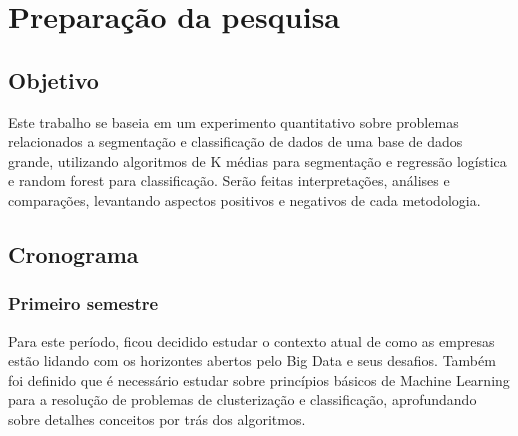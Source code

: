 
\part{Preparação da pesquisa}

\chapter{Objetivo}

Este trabalho se baseia em um experimento quantitativo sobre problemas relacionados a segmentação e classificação de dados de uma base de dados grande, utilizando algoritmos de K médias para segmentação e regressão logística e random forest para classificação. Serão feitas interpretações, análises e comparações, levantando aspectos positivos e negativos de cada metodologia.

\chapter{Cronograma}

\section{Primeiro semestre}

Para este período, ficou decidido estudar o contexto atual de como as empresas estão lidando com os horizontes abertos pelo Big Data e seus desafios. Também foi definido que é necessário estudar sobre princípios básicos de Machine Learning para a resolução de problemas de clusterização e classificação, aprofundando sobre detalhes conceitos por trás dos algoritmos.

